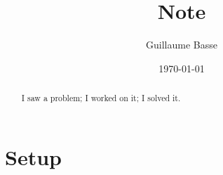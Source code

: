 \documentclass{article}
\date{\today}
\author{Guillaume Basse}
\title{Note}
\begin{document}
\maketitle

\begin{abstract}
I saw a problem; I worked on it; I solved it.
\end{abstract}


\bigskip

\section{Setup}




\end{document}

